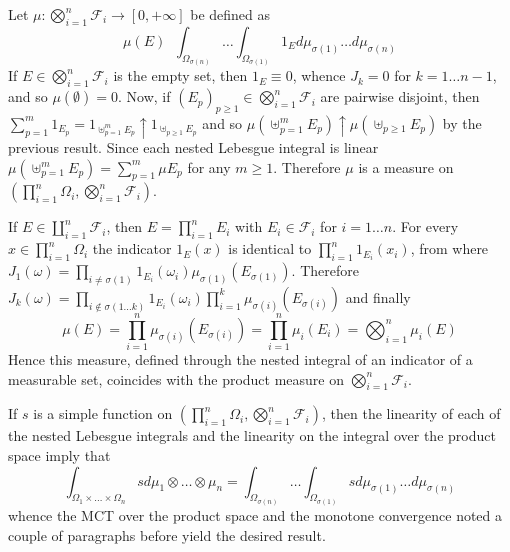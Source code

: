 \documentclass[a4paper]{article}
\newcommand{\clo}[1]{\left [ #1 \right ]}
\newcommand{\brac}[1]{\left ( #1 \right )}
\newcommand{\Zinf}{\clo{ 0, +\infty }}
\newcommand{\Fcal}{\mathcal{F}}
\newcommand{\defn}{\mathop{\overset{\Delta}{=}}\nolimits}
\begin{document}
Let $\mu:\bigotimes_{i=1}^n \Fcal_i\to\Zinf$ be defined as \[\mu\brac{E} \defn \int_{\Omega_{\sigma\brac{ n } } } \ldots \int_{\Omega_{\sigma\brac{ 1 } } } 1_E d\mu_{\sigma\brac{ 1 } } \ldots d\mu_{\sigma\brac{ n } }\] If $E\in \bigotimes_{i=1}^n \Fcal_i$ is the empty set, then $1_E\equiv 0$, whence $J_k = 0$ for $k=1\ldots n-1$, and so $\mu\brac{\emptyset} = 0$. Now, if $\brac{E_p}_{p\geq 1}\in \bigotimes_{i=1}^n \Fcal_i$ are pairwise disjoint, then $\sum_{p=1}^m 1_{E_p} = 1_{\uplus_{p=1}^m E_p} \uparrow 1_{\uplus_{p\geq 1} E_p}$ and so $\mu\brac{\uplus_{p=1}^m E_p}\uparrow \mu\brac{\uplus_{p\geq 1} E_p}$ by the previous result. Since each nested Lebesgue integral is linear $\mu\brac{\uplus_{p=1}^m E_p} = \sum_{p=1}^m \mu{E_p}$ for any $m\geq 1$. Therefore $\mu$ is a measure on $\brac{\prod_{i=1}^n \Omega_i, \bigotimes_{i=1}^n \Fcal_i}$.

If $E\in \coprod_{i=1}^n \Fcal_i$, then $E = \prod_{i=1}^n E_i$ with $E_i\in \Fcal_i$ for $i=1\ldots n$. For every $x \in \prod_{i=1}^n \Omega_i$ the indicator $1_E\brac{x}$ is identical to $\prod_{i=1}^n 1_{E_i}\brac{x_i}$, from where $J_1\brac{\omega} = \prod_{i\neq \sigma\brac{1} } 1_{E_i}\brac{\omega_i} \mu_{\sigma\brac{1}}\brac{E_{\sigma\brac{1}}}$. Therefore $J_k\brac{\omega} = \prod_{i\notin \sigma\brac{1\ldots k} } 1_{E_i}\brac{\omega_i} \prod_{i=1}^k \mu_{\sigma\brac{i}}\brac{E_{\sigma\brac{i}}}$ and finally \[\mu\brac{E} = \prod_{i=1}^n \mu_{\sigma\brac{i}}\brac{E_{\sigma\brac{i}}} = \prod_{i=1}^n \mu_i\brac{E_i} = \bigotimes_{i=1}^n \mu_i \brac{E}\] Hence this measure, defined through the nested integral of an indicator of a measurable set, coincides with the product measure on $\bigotimes_{i=1}^n \Fcal_i$.

If $s$ is a simple function on $\brac{\prod_{i=1}^n \Omega_i, \bigotimes_{i=1}^n \Fcal_i}$, then the linearity of each of the nested Lebesgue integrals and the linearity on the integral over the product space imply that \[\int_{\Omega_1\times \ldots \times\Omega_n} s d\mu_1\otimes \ldots \otimes\mu_n = \int_{\Omega_{\sigma\brac{ n } } } \ldots  \int_{\Omega_{\sigma\brac{ 1 } } } s d\mu_{\sigma\brac{ 1 } } \ldots d\mu_{\sigma\brac{ n } }\] whence the MCT over the product space and the monotone convergence noted a couple of paragraphs before yield the desired result.\\
\end{document}

